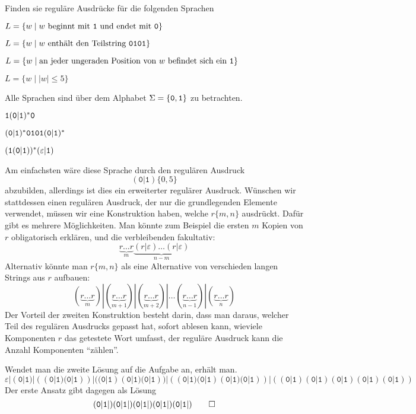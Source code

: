 Finden sie reguläre Ausdrücke für die folgenden Sprachen
\begin{teilaufgaben}
\item $L=\{w\;|\;\text{$w$ beginnt mit {\tt 1} und endet mit {\tt 0}}\}$
\item $L=\{w\;|\;\text{$w$ enthält den Teilstring {\tt 0101}}\}$
\item $L=\{w\;|\;\text{an jeder ungeraden Position von $w$ befindet sich ein {\tt 1}}\}$
\item $L=\{w\;|\;|w|\le 5\}$
\end{teilaufgaben}
Alle Sprachen sind über dem Alphabet $\Sigma=\{{\tt 0},{\tt 1}\}$ zu
betrachten.

\begin{loesung}
\begin{teilaufgaben}
\item ${\tt 1}({\tt 0}|{\tt 1})^*{\tt 0}$
\item $({\tt 0}|{\tt 1})^* {\tt 0101} ({\tt 0}|{\tt 1})^*$
\item $({\tt 1}({\tt 0}|{\tt 1}))^*(\varepsilon|{\tt 1})$
\item
Am einfachsten wäre diese Sprache durch den regulären Ausdruck 
\[
(\texttt{0}|\texttt{1})\{0,5\}
\]
abzubilden, allerdings ist dies ein erweiterter regulärer Ausdruck.
Wünschen wir stattdessen einen regulären Ausdruck, der nur die
grundlegenden Elemente verwendet, müssen wir eine Konstruktion haben,
welche $r\{m,n\}$ ausdrückt. Dafür gibt es mehrere Möglichkeiten.
Man könnte zum Beispiel die ersten $m$ Kopien von $r$ obligatorisch
erklären, und die verbleibenden fakultativ:
\[
\underbrace{r\dots r}_m\underbrace{(r|\varepsilon)\dots(r|\varepsilon)}_{n-m}
\]
Alternativ könnte man $r\{m,n\}$ als eine Alternative von verschieden langen
Strings aus $r$ aufbauen:
\[
(\underbrace{r\dots r}_m)|
(\underbrace{r\dots r}_{m+1})|
(\underbrace{r\dots r}_{m+2})|\dots
(\underbrace{r\dots r}_{n - 1})|
(\underbrace{r\dots r}_{n})
\]
Der Vorteil der zweiten Konstruktion besteht darin, dass man daraus, welcher
Teil des regulären Ausdrucks gepasst hat, sofort ablesen kann, wieviele
Komponenten $r$ das getestete Wort umfasst, der reguläre Ausdruck kann
die Anzahl Komponenten ``zählen''.

Wendet man die zweite Lösung auf die Aufgabe an, erhält man.
\[
\varepsilon|
(\texttt{0}|\texttt{1})|
((\texttt{0}|\texttt{1}) (\texttt{0}|\texttt{1}))|
((\texttt{0}|\texttt{1}) (\texttt{0}|\texttt{1}) (\texttt{0}|\texttt{1}))|
((\texttt{0}|\texttt{1}) (\texttt{0}|\texttt{1}) (\texttt{0}|\texttt{1}) (\texttt{0}|\texttt{1}))|
((\texttt{0}|\texttt{1}) (\texttt{0}|\texttt{1}) (\texttt{0}|\texttt{1}) (\texttt{0}|\texttt{1}) (\texttt{0}|\texttt{1}))
\]
Der erste Ansatz gibt dagegen als Lösung
\[
(\texttt{0}|\texttt{1}|)
(\texttt{0}|\texttt{1}|)
(\texttt{0}|\texttt{1}|)
(\texttt{0}|\texttt{1}|)
(\texttt{0}|\texttt{1}|)
\qedhere
\]
\end{teilaufgaben}
\end{loesung}
